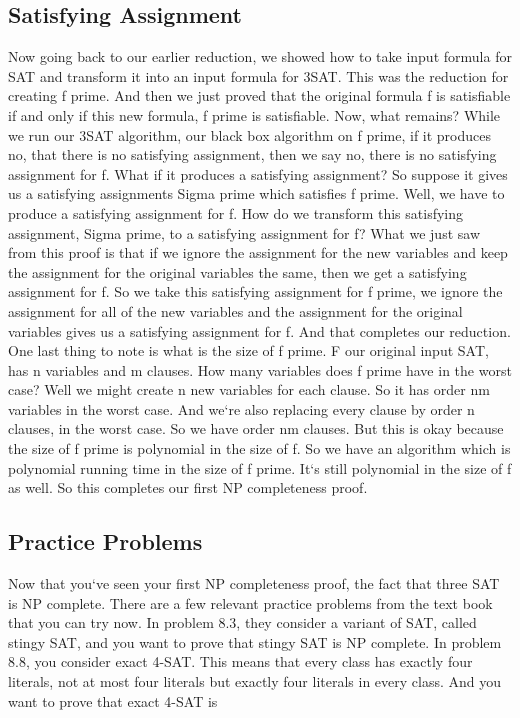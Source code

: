 \subsection{Satisfying Assignment}
Now going back to our earlier reduction, we showed how to take input formula for SAT and transform it into an input formula for 3SAT\@.
This was the reduction for creating f prime.
And then we just proved that the original formula f is satisfiable if and only if this new formula, f prime is satisfiable.
Now, what remains? While we run our 3SAT algorithm, our black box algorithm on f prime, if it produces no, that there is no satisfying assignment, then we say no, there is no satisfying assignment for f.
What if it produces a satisfying assignment? So suppose it gives us a satisfying assignments Sigma prime which satisfies f prime.
Well, we have to produce a satisfying assignment for f.
How do we transform this satisfying assignment, Sigma prime, to a satisfying assignment for f? What we just saw from this proof is that if we ignore the assignment for the new variables and keep the assignment for the original variables the same, then we get a satisfying assignment for f.
So we take this satisfying assignment for f prime, we ignore the assignment for all of the new variables and the assignment for the original variables gives us a satisfying assignment for f.
And that completes our reduction.
One last thing to note is what is the size of f prime.
F our original input SAT, has n variables and m clauses.
How many variables does f prime have in the worst case? Well we might create n new variables for each clause.
So it has order nm variables in the worst case.
And we`re also replacing every clause by order n clauses, in the worst case.
So we have order nm clauses.
But this is okay because the size of f prime is polynomial in the size of f.
So we have an algorithm which is polynomial running time in the size of f prime.
It`s still polynomial in the size of f as well.
So this completes our first NP completeness proof.

\subsection{Practice Problems}
Now that you`ve seen your first NP completeness proof, the fact that three SAT is NP complete.
There are a few relevant practice problems from the text book that you can try now.
In problem 8.3, they consider a variant of SAT, called stingy SAT, and you want to prove that stingy SAT is NP complete.
In problem 8.8, you consider exact 4-SAT\@.
This means that every class has exactly four literals, not at most four literals but exactly four literals in every class.
And you want to prove that exact 4-SAT is

